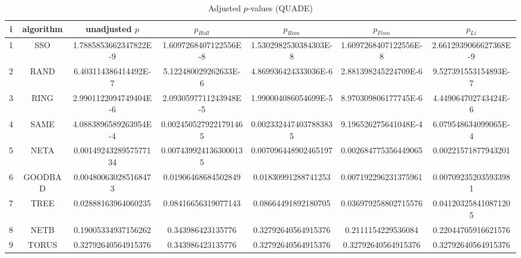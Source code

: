 \documentclass[a4paper,10pt]{article}
\begin{document}
\begin{landscape}
\begin{table}[!htp]
\centering\scriptsize
\caption{Adjusted $p$-values (QUADE)}
\begin{tabular}{ccccccc}
i&algorithm&unadjusted $p$&$p_{Holl}$&$p_{Rom}$&$p_{Finn}$&$p_{Li}$\\
\hline
1& SSO&1.7885853662347822E-9&1.6097268407122556E-8&1.5302982530384303E-8&1.6097268407122556E-8&2.6612939066627368E-9\\
2& RAND&6.403114386414492E-7&5.122480029262633E-6&4.869936424333036E-6&2.881398245224709E-6&9.527391553154893E-7\\
3& RING&2.9901122094749404E-6&2.0930597711243948E-5&1.990004086054699E-5&8.970309806177745E-6&4.449064702743424E-6\\
4& SAME&4.0883896589263954E-4&0.0024505279221791465&0.0023324474037883835&9.196526275641048E-4&6.079548634099065E-4\\
5& NETA&0.0014924328957577134&0.0074399241363000135&0.007096448902465197&0.002684775356449065&0.00221571877943201\\
6& GOODBAD&0.004800630285168473&0.01906468684502849&0.01830991288741253&0.007192296231375961&0.007092352035933981\\
7& TREE&0.02888163964060235&0.08416656319077143&0.08664491892180705&0.036979258802715576&0.041203258410871205\\
8& NETB&0.19005334937156262&0.343986423135776&0.32792640564915376&0.2111154229536084&0.22044705916621576\\
9& TORUS&0.32792640564915376&0.343986423135776&0.32792640564915376&0.32792640564915376&0.32792640564915376\\
\hline
\end{tabular}
\end{table}

\end{landscape}
\end{document}
